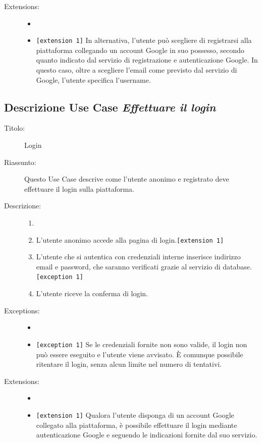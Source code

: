 \documentclass[11pt, a4paper]{article}
\theoremstyle{definition} %
\begin{document}
\begin{description}
    \item[Extensions:]
    \begin{itemize}
        \item[]
        \item \texttt{[extension 1]} In alternativa, l'utente può scegliere di registrarsi alla piattaforma collegando un account Google in suo possesso, secondo quanto indicato dal servizio di registrazione e autenticazione Google.
        In questo caso, oltre a scegliere l'email come previsto dal servizio di Google, l'utente specifica l'username.
    \end{itemize}
\end{description}

\newpage
\subsection*{Descrizione Use Case \textit{Effettuare il login}}
\begin{description}
    \item[Titolo:] Login
    
    \item[Riassunto:] Questo Use Case descrive come l'utente anonimo e registrato deve
    effettuare il login sulla piattaforma.

    \item[Descrizione:]
    \begin{enumerate}
        \item[]
        \item L'utente anonimo accede alla pagina di login.\texttt{[extension 1]}
        \item L'utente che si autentica con credenziali interne inserisce indirizzo email e password, che saranno verificati grazie al servizio di database.\texttt{[exception 1]}
        \item L'utente riceve la conferma di login.
    \end{enumerate}
    
    \item[Exceptions:]
    \begin{itemize}
        \item[]
        \item \verb|[exception 1]| Se le credenziali fornite non sono valide, il login non può essere eseguito e l'utente viene avvisato.
        È comunque possibile ritentare il login, senza alcun limite nel numero di tentativi.
    \end{itemize}

    \item[Extensions:]
    \begin{itemize}
        \item[]
        \item \texttt{[extension 1]} Qualora l'utente disponga di un account Google collegato alla piattaforma, è possibile effettuare il login
        mediante autenticazione Google e seguendo le indicazioni fornite dal suo servizio.
    \end{itemize}
\end{description}
\end{document}
